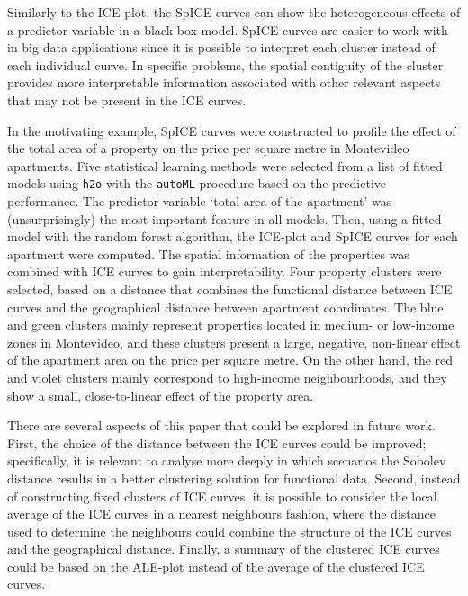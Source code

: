 \documentclass[smallextended,natbib]{svjour3}\usepackage[]{graphicx}\usepackage[]{xcolor}
\begin{document}
Similarly to the ICE-plot, the SpICE curves can show the heterogeneous effects of a predictor variable in a black box model. SpICE curves are easier to work with in big data applications since it is possible to interpret each cluster instead of each individual curve. In specific problems, the spatial contiguity of the cluster provides more interpretable information associated with other relevant aspects that may not be present in the ICE curves. 

In the motivating example, SpICE curves were constructed to profile the effect of the total area of a property on the  price per square metre in Montevideo apartments. Five statistical learning methods were selected from a list of fitted models using \texttt{h2o} with the \texttt{autoML} procedure based on the predictive performance. The predictor variable `total area of the apartment' was (unsurprisingly) the most important feature in  all models. Then, using a fitted model with the random forest algorithm, the ICE-plot and SpICE curves for each apartment were computed. The spatial information of the properties was combined with ICE curves to gain interpretability. Four property clusters were selected, based on a distance that combines the functional distance between ICE curves and the geographical distance between apartment coordinates.  The blue and green clusters mainly represent properties located in medium- or low-income zones in Montevideo, and these clusters present a large, negative, non-linear effect of the apartment area on the price per square metre. On the other hand, the red and violet clusters mainly correspond to high-income neighbourhoods, and they show a small, close-to-linear effect of the property area. 

There are several aspects of this paper that could be explored in future work. First, the choice of the distance between the ICE curves could be improved; specifically, it is relevant to analyse more deeply in which scenarios the Sobolev distance results in a better clustering solution for functional data.  Second, instead of constructing fixed clusters of ICE curves, it is possible to consider the local average of the ICE curves in a nearest neighbours fashion, where the distance used to determine the neighbours could combine the structure of the ICE curves and the geographical distance. Finally, a summary of the clustered ICE curves could be based on the ALE-plot instead of the average of the clustered ICE curves. 
\end{document}
